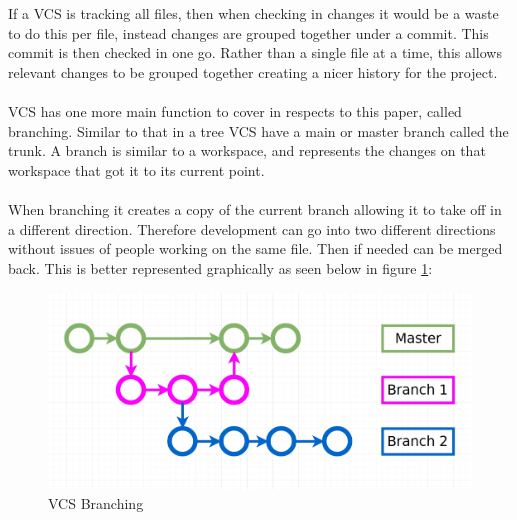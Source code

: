 \\\\
If a VCS is tracking all files, then when checking in changes it would be a waste to do this per file, instead changes are grouped together under a commit. This commit is then checked in one go. Rather than a single file at a time, this allows relevant changes to be grouped together creating a nicer history for the project.
\\\\
VCS has one more main function to cover in respects to this paper, called branching. Similar to that in a tree VCS have a main or master branch called the trunk. A branch is similar to a workspace, and represents the changes on that workspace that got it to its current point.
\\\\
When branching it creates a copy of the current branch allowing it to take off in a different direction. Therefore development can go into two different directions without issues of people working on the same file. Then if needed can be merged back. This is better represented graphically as seen below in figure \ref{fig:vcs_branching}:

\begin{figure}[H]
	\centering
	\includegraphics[scale=0.30]{images/branching.jpg}
	\caption{VCS Branching}
	\label{fig:vcs_branching}
\end{figure}

